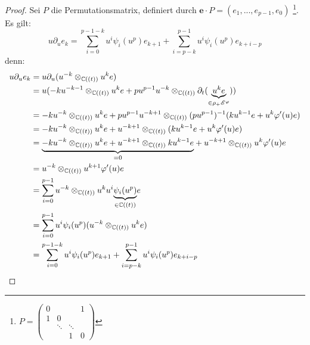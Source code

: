 \begin{proof}
Sei $P$ die Permutationsmatrix, definiert durch
$\mathbf{e}\cdot P=(e_1,...,e_{p-1},e_0)$
\footnote{$P=\begin{pmatrix}0 &  &  & 1\\
1 & 0\\
 & \ddots & \ddots\\
 &  & 1 & 0
\end{pmatrix}$}.\\
Es gilt:\\
\[ u\partial_ue_k= \sum_{i=0}^{p-1-k}u^i\psi_i(u^p)e_{k+1} +
  \sum_{i=p-k}^{p-1}u^i\psi_i(u^p)e_{k+i-p} \]
denn:\\
\begin{align*}
  u\partial_ue_k &= u\partial_u(u^{-k}\otimes_{\mathbb{C}((t))}u^ke)\\
  &= u(-ku^{-k-1}\otimes_{\mathbb{C}((t))}u^ke +
    pu^{p-1}u^{-k}\otimes_{\mathbb{C}((t))}\partial_t
    (\underset{\in\rho_+\mathscr{E}^\varphi}{\underbrace{u^ke}}))\\
  &= -ku^{-k}\otimes_{\mathbb{C}((t))}u^ke +
    pu^{p-1}u^{-k+1}\otimes_{\mathbb{C}((t))}(pu^{p-1})^{-1} (ku^{k-1}e
    + u^k\varphi'(u)e)\\
  &= -ku^{-k}\otimes_{\mathbb{C}((t))}u^ke +
    u^{-k+1}\otimes_{\mathbb{C}((t))}(ku^{k-1}e + u^k\varphi'(u)e)\\
  &= \underset{=0}{\underbrace{-ku^{-k}\otimes_{\mathbb{C}((t))}u^ke +
    u^{-k+1}\otimes_{\mathbb{C}((t))}ku^{k-1}e}} +
    u^{-k+1}\otimes_{\mathbb{C}((t))}u^k\varphi'(u)e\\
  &= u^{-k}\otimes_{\mathbb{C}((t))}u^{k+1}\varphi'(u)e\\
  &= \sum_{i=0}^{p-1}u^{-k}\otimes_{\mathbb{C}((t))}
    u^{k}u^i\underset{\in\mathbb{C}((t))}{\underbrace{\psi_i(u^p)}}e\\
  &= \sum_{i=0}^{p-1}u^i\psi_i(u^p)(u^{-k}\otimes_{\mathbb{C}((t))} u^{k}e)\\
  &= \sum_{i=0}^{p-1-k}u^i\psi_i(u^p)e_{k+1} +
  \sum_{i=p-k}^{p-1}u^i\psi_i(u^p)e_{k+i-p}
\end{align*}


\end{proof}
